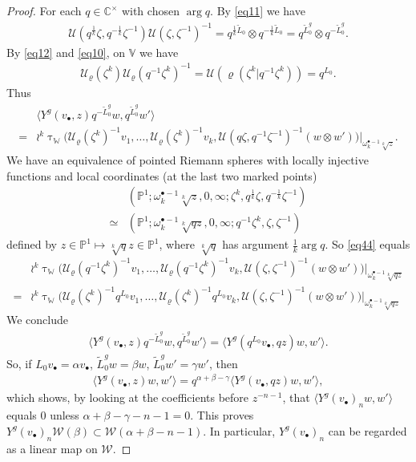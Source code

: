 \documentclass[12pt,a4paper,notitlepage]{article}
\theoremstyle{definition}
\theoremstyle{plain}
\newcommand{\mc}{\mathcal}
\newcommand{\wtd}{\widetilde}
\newcommand{\bk}[1]{\langle {#1}\rangle}
\newcommand{\blt}{\bullet}
\newcommand{\Vbb}{\mathbb V}
\newcommand{\Wbb}{\mathbb W}
\newcommand{\Cbb}{\mathbb C}
\newcommand{\Pbb}{\mathbb P}
\numberwithin{equation}{section}
\begin{document}
\begin{proof}
For each $q\in\Cbb^\times$ with chosen $\arg q$. By \eqref{eq11} we have
\begin{align*}
\mc U(q^{\frac 1k}\zeta,q^{-\frac 1k}\zeta^{-1})\mc U(\zeta,\zeta^{-1})^{-1}=q^{\frac 1k\wtd L_0}\otimes q^{-\frac 1k\wtd L_0}=q^{\wtd L_0^g}\otimes q^{-\wtd L_0^g}.	
\end{align*}
By \eqref{eq12} and \eqref{eq10}, on $\Vbb$ we have
\begin{align*}
\mc U_\varrho(\zeta^k)\mc U_\varrho(q^{-1}\zeta^k)^{-1}=\mc U(\varrho(\zeta^k|q^{-1}\zeta^k))=q^{L_0}.	
\end{align*}
Thus
\begin{align}
&\bk{Y^g(v_\blt,z)q^{-\wtd L_0^g}w,q^{\wtd L_0^g}w'}\nonumber\\
=&\wr^k\uptau_\Wbb\big(\mc U_\varrho(\zeta^k)^{-1}v_1,\dots,\mc U_\varrho(\zeta^k)^{-1}v_k,\mc U(q\zeta,q^{-1}\zeta^{-1})^{-1}(w\otimes w')\big)\Big|_{\omega_k^{\blt-1}\sqrt[k]z}.	\label{eq44}
\end{align}
We have an equivalence of pointed Riemann spheres with locally injective functions and local coordinates (at the last two marked points)
\begin{align*}
&(\Pbb^1;\omega_k^{\blt-1}\sqrt[k]z,0,\infty;\zeta^k,q^{\frac 1k}\zeta,q^{-\frac 1k}\zeta^{-1})\\
\simeq&	(\Pbb^1;\omega_k^{\blt-1}\sqrt[k]{qz},0,\infty;q^{-1}\zeta^k,\zeta,\zeta^{-1})
\end{align*}
defined by $z\in\Pbb^1\mapsto \sqrt[k]{q}z\in\Pbb^1$, where $\sqrt[k]{q}$ has argument $\frac 1k\arg q$. So \eqref{eq44} equals
\begin{align*}
&\wr^k\uptau_\Wbb\big(\mc U_\varrho(q^{-1}\zeta^k)^{-1}v_1,\dots,\mc U_\varrho(q^{-1}\zeta^k)^{-1}v_k,\mc U(\zeta,\zeta^{-1})^{-1}(w\otimes w')\big)\Big|_{\omega_k^{\blt-1}\sqrt[k]{qz}}\\
=&\wr^k\uptau_\Wbb\big(\mc U_\varrho(\zeta^k)^{-1}q^{L_0}v_1,\dots,\mc U_\varrho(\zeta^k)^{-1}q^{L_0}v_k,\mc U(\zeta,\zeta^{-1})^{-1}(w\otimes w')\big)\Big|_{\omega_k^{\blt-1}\sqrt[k]{qz}}
\end{align*}
We conclude
\begin{align*}
\bk{Y^g(v_\blt,z)q^{-\wtd L_0^g}w,q^{\wtd L_0^g}w'}=\bk{Y^g(q^{L_0}v_\blt,qz)w,w'}.	
\end{align*}
So, if $L_0 v_\blt=\alpha v_\blt$, $\wtd L_0^gw=\beta w$, $\wtd L_0^g w'=\gamma w'$, then
\begin{align*}
\bk{Y^g(v_\blt,z)w,w'}=q^{\alpha+\beta-\gamma}\bk{Y^g(v_\blt,qz)w,w'},	
\end{align*}
which shows, by looking at the coefficients before  $z^{-n-1}$, that $\bk {Y^g(v_\blt)_nw,w'}$ equals $0$ unless $\alpha+\beta-\gamma-n-1=0$. This proves $Y^g(v_\blt)_n\mc W(\beta)\subset \mc W(\alpha+\beta-n-1)$. In particular, $Y^g(v_\blt)_n$ can be regarded as a linear map on $\mc W$.
\end{proof}
\end{document}
